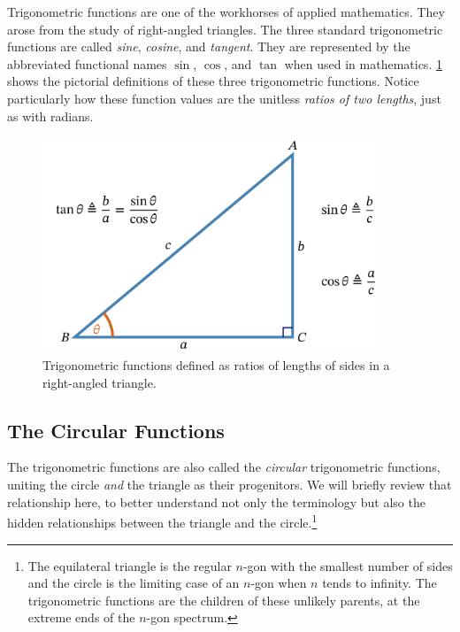 \documentclass[
  a4paper,
]{article}
\begin{document}
Trigonometric functions are one of the workhorses of applied
mathematics. They arose from the study of right-angled triangles. The
three standard trigonometric functions are called \emph{sine},
\emph{cosine}, and \emph{tangent}. They are represented by the
abbreviated functional names \(\sin\), \(\cos\), and \(\tan\) when used
in mathematics. \cref{fig:trig} shows the pictorial definitions of these
three trigonometric functions. Notice particularly how these function
values are the unitless \emph{ratios of two lengths}, just as with
radians.

\begin{figure}
\hypertarget{fig:trig}{%
\centering
\includegraphics[width=0.9\textwidth,height=\textheight]{images/trig.png}
\caption{Trigonometric functions defined as ratios of lengths of sides
in a right-angled triangle.}\label{fig:trig}
}
\end{figure}

\hypertarget{the-circular-functions}{%
\subsection{The Circular Functions}\label{the-circular-functions}}

The trigonometric functions are also called the \emph{circular}
trigonometric functions, uniting the circle \emph{and} the triangle as
their progenitors. We will briefly review that relationship here, to
better understand not only the terminology but also the hidden
relationships between the triangle and the circle.\footnote{The
  equilateral triangle is the regular \(n\)-gon with the smallest number
  of sides and the circle is the limiting case of an \(n\)-gon when
  \(n\) tends to infinity. The trigonometric functions are the children
  of these unlikely parents, at the extreme ends of the \(n\)-gon
  spectrum.}
\end{document}
